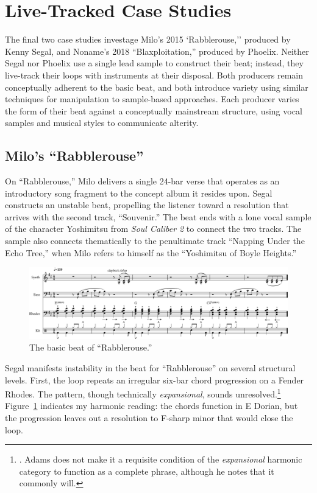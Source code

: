 \section{Live-Tracked Case Studies}
The final two case studies investage Milo's 2015 `Rabblerouse,'' produced by Kenny Segal, and Noname's 2018 ``Blaxploitation,'' produced by Phoelix. Neither Segal nor Phoelix use a single lead sample to construct their beat; instead, they live-track their loops with instruments at their disposal. Both producers remain conceptually adherent to the basic beat, and both introduce variety using similar techniques for manipulation to sample-based approaches. Each producer varies the form of their beat against a conceptually mainstream structure, using vocal samples and musical styles to communicate alterity.

\subsection*{\centering Milo's ``Rabblerouse''}

On ``Rabblerouse,'' Milo delivers a single 24-bar verse that operates as an introductory song fragment to the concept album it resides upon. Segal constructs an unstable beat, propelling the listener toward a resolution that arrives with the second track, ``Souvenir.'' The beat ends with a lone vocal sample of the character Yoshimitsu from \textit{Soul Caliber 2} to connect the two tracks. The sample also connects thematically to the penultimate track ``Napping Under the Echo Tree,'' when Milo refers to himself as the ``Yoshimitsu of Boyle Heights.''

\begin{figure}[h]
    \centering
    \includegraphics[width=\textwidth]{images/figures/chp 02/Figure-02.4-Rabblerouse-BB.pdf}
    \caption{The basic beat of ``Rabblerouse.''}
    \label{fig:3.1}
\end{figure}

Segal manifests instability in the beat for ``Rabblerouse'' on several structural levels. First, the loop repeats an irregular six-bar chord progression on a Fender Rhodes. The pattern, though technically \emph{expansional}, sounds unresolved.\footnote{\cite{kyleadamsHarmonicSyntacticMotivic2020}. Adams does not make it a requisite condition of the \emph{expansional} harmonic category to function as a complete phrase, although he notes that it commonly will.} Figure~\ref{fig:3.1} indicates my harmonic reading: the chords function in E Dorian, but the progression leaves out a resolution to F-sharp minor that would close the loop.

